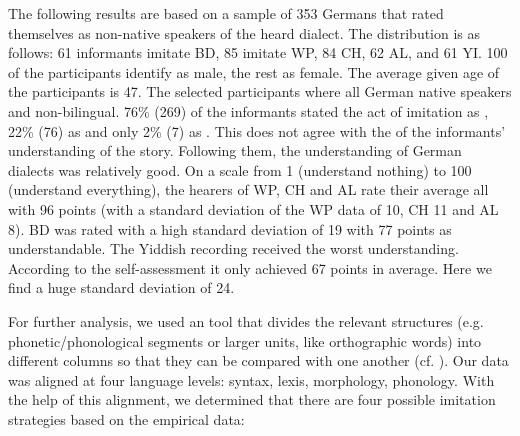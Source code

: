 \documentclass[output=paper]{LSP/langsci}
\begin{document}
The following results are based on a sample of 353 Germans that rated themselves as non-native speakers of the heard dialect. The distribution is as follows: 61 informants imitate BD, 85 imitate WP, 84 CH, 62 AL, and 61 YI. 100 of the participants identify as male, the rest as female. The average given age of the participants is 47. The selected participants where all German native speakers and non-bilingual. 76\% (269) of the informants stated the act of imitation as , 22\% (76) as  and only 2\% (7) as . This does not agree with the  of the informants' understanding of the story. Following them, the understanding of German dialects was rela\-tively good. On a scale from 1 (understand nothing) to 100 (understand everything), the hearers of WP, CH and AL rate their average all with 96 points (with a standard deviation of the WP data of 10, CH 11 and AL 8). BD was rated with a high standard deviation of 19 with 77 points as understandable. The Yiddish recording received the worst understanding. According to the self-assessment it only achieved 67 points in average. Here we find a huge standard deviation of 24.

For further analysis, we used an  tool that divides the relevant structures (e.g. phonetic/phonological segments or larger units, like orthographic words) into different columns so that they can be compared with one another (cf. \citealt{mayer_language_2012}). Our data was aligned at four language levels: syntax, lexis, morphology, phonology. With the help of this alignment, we determined that there are four possible imitation strategies based on the empirical data:
 
\end{document}
